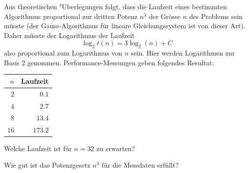 Aus theoretischen "Uberlegungen folgt, dass die Laufzeit eines bestimmten
Algorithmus proportional zur dritten Potenz $n^3$ der
Grösse $n$ des Problems sein müsste (der Gauss-Al\-go\-rith\-mus
für lineare Gleichungssystem ist von dieser Art). Daher müsste
der Logarithmus der Laufzeit 
\[
\log_2 t(n)=3\log_2(n) +C
\]
also proportional zum Logarithmus von $n$ sein.
Hier werden Logarithmen zur Basis 2 genommen.
Performance-Messungen geben folgendes Resultat:
\begin{center}
\begin{tabular}{|r|r|}
\hline
$n$&Laufzeit\\
\hline
$ 2$&$  0.1$\\
$ 4$&$  2.7$\\
$ 8$&$ 13.4$\\
$16$&$173.2$\\
\hline
\end{tabular}
\end{center}
\begin{teilaufgaben}
\item Welche Laufzeit ist für $n=32$ zu erwarten?
\item Wie gut ist das Potenzgesetz $n^3$ für die Messdaten erfüllt?
\end{teilaufgaben}


